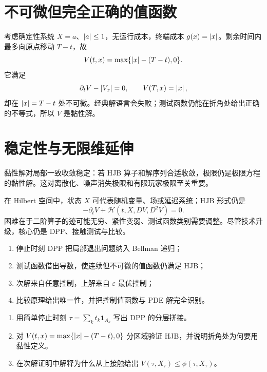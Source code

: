 \section{不可微但完全正确的值函数}

考虑确定性系统 $\dot X=a$、$\left\lvert a\right\rvert\le1$，无运行成本，终端成本 $g(x)=\left\lvert x\right\rvert$。剩余时间内最多向原点移动 $T-t$，故
\[
V(t,x)=\max\{\left\lvert x\right\rvert-(T-t),0\}.
\]
它满足
\[
\partial_tV-\left\lvert V_x\right\rvert=0,\qquad V(T,x)=\left\lvert x\right\rvert,
\]
却在 $\left\lvert x\right\rvert=T-t$ 处不可微。经典解语言会失败；测试函数仍能在折角处给出正确的不等式，所以 $V$ 是黏性解。

\begin{center}
\end{center}

\section{稳定性与无限维延伸}

黏性解对局部一致收敛稳定：若 HJB 算子和解序列合适收敛，极限仍是极限方程的黏性解。这对离散化、噪声消失极限和有限玩家极限至关重要。

在 Hilbert 空间中，状态 $X$ 可代表随机变量、场或延迟系统；HJB 形式仍是
\[
-\partial_tV+\mathscr H(t,X,DV,D^2V)=0.
\]
困难在于二阶算子的迹可能无穷、紧性变弱、测试函数类别需要调整。尽管技术升级，核心仍是 DPP、接触测试与比较。

\begin{takeaway}
\begin{enumerate}
  \item 停止时刻 DPP 把局部退出问题纳入 Bellman 递归；
  \item 测试函数借出导数，使连续但不可微的值函数仍满足 HJB；
  \item 次解来自任意控制，上解来自 $\varepsilon$-最优控制；
  \item 比较原理给出唯一性，并把控制值函数与 PDE 解完全识别。
\end{enumerate}
\end{takeaway}

\begin{exercisebox}
\begin{enumerate}
  \item 用简单停止时刻 $\tau=\sum_k t_k\mathbf 1_{A_k}$ 写出 DPP 的分层拼接。
  \item 对 $V(t,x)=\max\{\left\lvert x\right\rvert-(T-t),0\}$ 分区域验证 HJB，并说明折角处为何要用黏性定义。
  \item 在次解证明中解释为什么从上接触给出 $V(\tau,X_\tau)\le\phi(\tau,X_\tau)$。
\end{enumerate}
\end{exercisebox}
